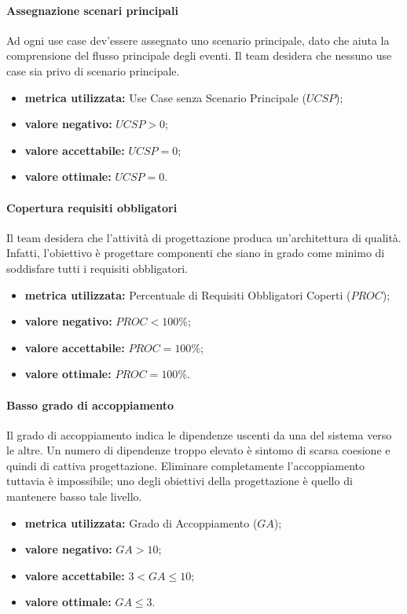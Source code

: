 			\paragraph{Assegnazione scenari principali}
				\label{OASP}
				Ad ogni use case dev'essere assegnato uno scenario principale, dato che aiuta la comprensione del flusso principale degli eventi. Il team desidera che nessuno use case sia privo di scenario principale.
				\begin{itemize}
					\item \textbf{metrica utilizzata:} Use Case senza Scenario Principale ($UCSP$);
					\item \textbf{valore negativo:} $UCSP>0$;
					\item \textbf{valore accettabile:} $UCSP=0$;
					\item \textbf{valore ottimale:} $UCSP=0$.
				\end{itemize}
			
			\paragraph{Copertura requisiti obbligatori}
				\label{OCRO}
				Il team desidera che l'attività di progettazione produca un'architettura di qualità. Infatti, l'obiettivo è progettare componenti che siano in grado come minimo di soddisfare tutti i requisiti obbligatori.
				\begin{itemize}
					\item \textbf{metrica utilizzata:} Percentuale di Requisiti Obbligatori Coperti ($PROC$);
					\item \textbf{valore negativo:} $PROC<100\%$;
					\item \textbf{valore accettabile:} $PROC=100\%$;
					\item \textbf{valore ottimale:} $PROC=100\%$.
				\end{itemize}
			
			\paragraph{Basso grado di accoppiamento}
				\label{OBGDA}
				Il grado di accoppiamento indica le dipendenze uscenti da una  del sistema verso le altre. Un numero di dipendenze troppo elevato è sintomo di scarsa coesione e quindi di cattiva progettazione. Eliminare completamente l'accoppiamento tuttavia è impossibile; uno degli obiettivi della progettazione è quello di mantenere basso tale livello.
				\begin{itemize}
					\item \textbf{metrica utilizzata:} Grado di Accoppiamento ($GA$);
					\item \textbf{valore negativo:} $GA > 10$;
					\item \textbf{valore accettabile:} $3<GA \leq 10$;
					\item \textbf{valore ottimale:} $GA\leq3$.
				\end{itemize}
		
